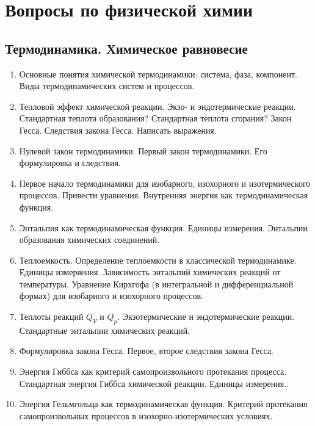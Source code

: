 \section{Вопросы по физической химии}
\subsection{Термодинамика. Химическое равновесие}
\begin{enumerate}
\item 
Основные понятия химической термодинамики: система, фаза, компонент. Виды термодинамических систем и процессов. 

\item 
Тепловой эффект химической реакции. Экзо- и эндотермические реакции. Стандартная теплота образования? Стандартная теплота сгорания? Закон Гесса. Следствия закона Гесса. Написать выражения.
 
\item 
Нулевой закон термодинамики. Первый закон термодинамики. Его формулировка и следствия. 

\item 
Первое начало термодинамики для изобарного, изохорного и изотермического процессов. Привести уравнения. Внутренняя энергия как термодинамическая функция.
 
\item 
Энтальпия как термодинамическая функция. Единицы измерения. Энтальпии образования химических соединений.
 
\item 
Теплоемкость. Определение теплоемкости в классической термодинамике. Единицы измеряения. Зависимость энтальпий химических реакций от температуры. Уравнение Кирхгофа (в интегральной и дифференциальной формах) для изобарного и изохорного процессов.
 
\item 
Теплоты реакций $Q_{V}$ и $Q_{p}$. Экзотермические и эндотермические реакции. Стандартные энтальпии химических реакций. 
 
\item 
Формулировка закона Гесса. Первое, второе следствия закона Гесса.
 
\item 
Энергия Гиббса как критерий самопроизвольного протекания процесса. Стандартная энергия Гиббса химической реакции. Единицы измерения..
 
\item 
Энергия Гельмгольца как термодинамическая функция. Критерий протекания самопроизвольных процессов в изохорно-изотермических условиях. 
 

\end{enumerate}
